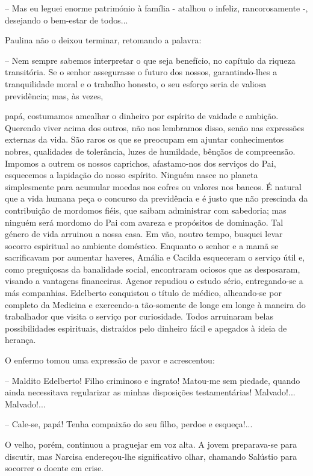 \documentclass[portuguese,12pt,a4paper]{scrbook}
\begin{document}
	– Mas eu leguei enorme património à família - atalhou o infeliz, rancorosamente -, desejando o bem-estar de todos...
	
	Paulina não o deixou terminar, retomando a palavra:
	
	– Nem sempre sabemos interpretar o que seja benefício, no capítulo da riqueza transitória. Se o senhor assegurasse o futuro dos nossos, garantindo-lhes a tranquilidade moral e o trabalho honesto, o seu esforço seria de valiosa previdência; mas, às vezes,
	
	
	papá, costumamos amealhar o dinheiro por espírito de vaidade e ambição. Querendo viver acima dos outros, não nos lembramos disso, senão nas expressões externas da vida. São raros os que se preocupam em ajuntar conhecimentos nobres, qualidades de tolerância, luzes de humildade, bênçãos de compreensão. Impomos a outrem os nossos caprichos, afastamo-nos dos serviços do Pai, esquecemos a lapidação do nosso espírito. Ninguém nasce no planeta simplesmente para acumular moedas nos cofres ou valores nos bancos. É natural que a vida humana peça o concurso da previdência e é justo que não prescinda da contribuição de mordomos fiéis, que saibam administrar com sabedoria; mas ninguém será mordomo do Pai com avareza e propósitos de dominação. Tal género de vida arruinou a nossa casa. Em vão, noutro tempo, busquei levar socorro espiritual ao ambiente doméstico. Enquanto o senhor e a mamã se sacrificavam por aumentar haveres, Amália e Cacilda esqueceram o serviço útil e, como preguiçosas da banalidade social, encontraram ociosos que as desposaram, visando a vantagens financeiras. Agenor repudiou o estudo sério, entregando-se a más companhias. Edelberto conquistou o título de médico, alheando-se por completo da Medicina e exercendo-a tão-somente de longe em longe à maneira do trabalhador que visita o serviço por curiosidade. Todos arruinaram belas possibilidades espirituais, distraídos pelo dinheiro fácil e apegados à ideia de herança.
	
	O enfermo tomou uma expressão de pavor e acrescentou:
	
	– Maldito Edelberto! Filho criminoso e ingrato! Matou-me sem piedade, quando ainda necessitava regularizar as minhas disposições testamentárias! Malvado!... Malvado!...
	
	– Cale-se, papá! Tenha compaixão do seu filho, perdoe e esqueça!...
	
	O velho, porém, continuou a praguejar em voz alta. A jovem preparava-se para discutir, mas Narcisa endereçou-lhe significativo olhar, chamando Salústio para socorrer o doente em crise.
	
\end{document}
